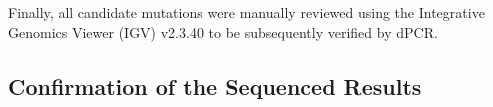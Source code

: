 Finally, all candidate mutations were manually reviewed using the Integrative Genomics Viewer (IGV) v2.3.40 to be subsequently verified by dPCR.

\subsection{Confirmation of the Sequenced Results}



